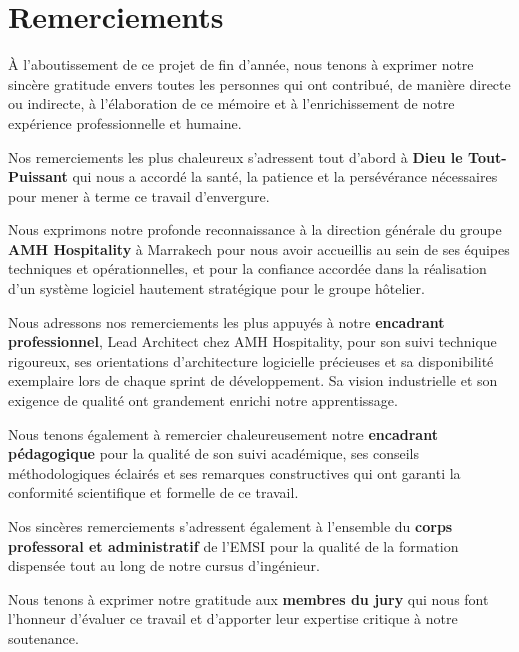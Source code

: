 \documentclass[12pt,a4paper,oneside]{report}
\begin{document}
\clearpage

\chapter*{Remerciements}

À l'aboutissement de ce projet de fin d'année, nous tenons à exprimer notre sincère gratitude envers toutes les personnes qui ont contribué, de manière directe ou indirecte, à l'élaboration de ce mémoire et à l'enrichissement de notre expérience professionnelle et humaine.

Nos remerciements les plus chaleureux s'adressent tout d'abord à \textbf{Dieu le Tout-Puissant} qui nous a accordé la santé, la patience et la persévérance nécessaires pour mener à terme ce travail d'envergure.

Nous exprimons notre profonde reconnaissance à la direction générale du groupe \textbf{AMH Hospitality} à Marrakech pour nous avoir accueillis au sein de ses équipes techniques et opérationnelles, et pour la confiance accordée dans la réalisation d'un système logiciel hautement stratégique pour le groupe hôtelier.

Nous adressons nos remerciements les plus appuyés à notre \textbf{encadrant professionnel}, Lead Architect chez AMH Hospitality, pour son suivi technique rigoureux, ses orientations d'architecture logicielle précieuses et sa disponibilité exemplaire lors de chaque sprint de développement. Sa vision industrielle et son exigence de qualité ont grandement enrichi notre apprentissage.

Nous tenons également à remercier chaleureusement notre \textbf{encadrant pédagogique} pour la qualité de son suivi académique, ses conseils méthodologiques éclairés et ses remarques constructives qui ont garanti la conformité scientifique et formelle de ce travail.

Nos sincères remerciements s'adressent également à l'ensemble du \textbf{corps professoral et administratif} de l'EMSI pour la qualité de la formation dispensée tout au long de notre cursus d'ingénieur.

Nous tenons à exprimer notre gratitude aux \textbf{membres du jury} qui nous font l'honneur d'évaluer ce travail et d'apporter leur expertise critique à notre soutenance.
\end{document}
